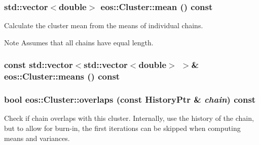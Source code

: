 \label{classeos_1_1Cluster_a346a8e945ea0be679c9eb372e589619b}
\hypertarget{classeos_1_1Cluster_a9b2fc51a3435f161f359f6a11f02dacb}{
\subsubsection[{mean}]{\setlength{\rightskip}{0pt plus 5cm}std::vector$<$double$>$ eos::Cluster::mean () const}}
\label{classeos_1_1Cluster_a9b2fc51a3435f161f359f6a11f02dacb}
Calculate the cluster mean from the means of individual chains.

\begin{DoxyNote}{Note}
Assumes that all chains have equal length. 
\end{DoxyNote}
\hypertarget{classeos_1_1Cluster_a12f80fe40193349914094f49fbdc18a2}{
\subsubsection[{means}]{\setlength{\rightskip}{0pt plus 5cm}const std::vector$<$std::vector$<$double$>$ $>$\& eos::Cluster::means () const}}
\label{classeos_1_1Cluster_a12f80fe40193349914094f49fbdc18a2}
\hypertarget{classeos_1_1Cluster_a944a35443f5bfa64317c843c9733d84e}{
\subsubsection[{overlaps}]{\setlength{\rightskip}{0pt plus 5cm}bool eos::Cluster::overlaps (const {\bf HistoryPtr} \& {\em chain}) const}}
\label{classeos_1_1Cluster_a944a35443f5bfa64317c843c9733d84e}
Check if chain overlaps with this cluster. Internally, use the history of the chain, but to allow for burn-\/in, the first iterations can be skipped when computing means and variances.


